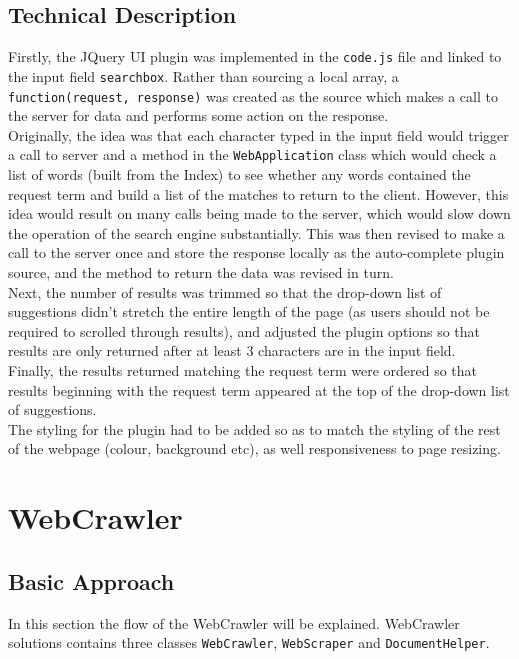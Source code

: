 \subsection{Technical Description}
Firstly, the JQuery UI plugin was implemented in the {\tt code.js} file and linked to the input field {\tt searchbox}. Rather than sourcing a local array, a {\tt function(request, response)} was created as the source which makes a call to the server for data and performs some action on the response.\\
Originally, the idea was that each character typed in the input field would trigger a call to server and a method in the {\tt WebApplication} class which would check a list of words (built from the Index) to see whether any words contained the request term and build a list of the matches to return to the client. However, this idea would result on many calls being made to the server, which would slow down the operation of the search engine substantially. This was then revised to make a call to the server once and store the response locally as the auto-complete plugin source, and the method to return the data was revised in turn.\\
Next, the number of results was trimmed so that the drop-down list of suggestions didn't stretch the entire length of the page (as users should not be required to scrolled through results), and adjusted the plugin options so that results are only returned after at least 3 characters are in the input field.\\
Finally, the results returned matching the request term were ordered so that results beginning with the request term appeared at the top of the drop-down list of suggestions.\\
The styling for the plugin had to be added so as to match the styling of the rest of the webpage (colour, background etc), as well responsiveness to page resizing.

\section{WebCrawler}
\subsection{Basic Approach}

In this section the flow of the WebCrawler will be explained.
WebCrawler solutions contains three classes {\tt WebCrawler}, {\tt WebScraper} and {\tt DocumentHelper}.

